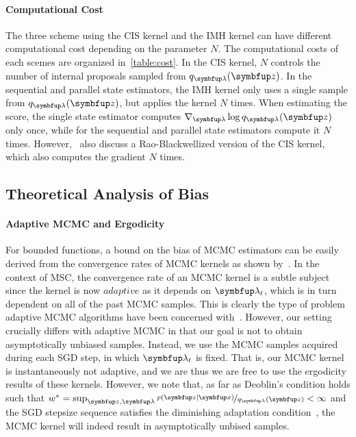\paragraph{Computational Cost}
The three scheme using the CIS kernel and the IMH kernel can have different computational cost depending on the parameter \(N\).
The computational costs of each scemes are organized in~\cref{table:cost}.
In the CIS kernel, \(N\) controls the number of internal proposals sampled from \(q_{\vlambda}(\vz)\).
In the sequential and parallel state estimators, the IMH kernel only uses a single sample from \(q_{\vlambda}(\vz)\), but applies the kernel \(N\) times.
When estimating the score, the single state estimator computes \(\nabla_{\vlambda} \log q_{\vlambda}(\vz)\) only once, while for the sequential and parallel state estimators compute it \(N\) times.
However,~\cite{NEURIPS2020_b2070693} also discuss a Rao-Blackwellized version of the CIS kernel, which also computes the gradient \(N\) times.

\subsection{Theoretical Analysis of Bias}\label{section:theory}

\vspace{-0.05in}
\paragraph{Adaptive MCMC and Ergodicity}
For bounded functions, a bound on the bias of MCMC estimators can be easily derived from the convergence rates of MCMC kernels as shown by~\citet[Theorem 4]{jiang_mcmc_2021}.
In the context of MSC, the convergence rate of an MCMC kernel is a subtle subject since the kernel is now \(adaptive\) as it depends on \(\vlambda_t\), which is in turn dependent on all of the past MCMC samples.
This is clearly the type of problem adaptive MCMC algorithms have been concerned with~\citep{andrieu_ergodicity_2006}.
However, our setting crucially differs with adaptive MCMC in that our goal is not to obtain asymptotically unbiased samples.
Instead, we use the MCMC samples acquired during each SGD step, in which \(\vlambda_t\) is fixed.
That is, our MCMC kernel is instantaneously not adaptive, and we are thus we are free to use the ergodicity results of these kernels.
However, we note that, as far as Deoblin's condition holds such that \(w^* = \sup_{\vz, \vlambda} \nicefrac{p\left(\vz\mid\vx\right)}{q_{\vlambda}\left(\vz\right)}  < \infty\) and the SGD stepsize sequence satisfies the diminishing adaptation condition~\citep{10.2307/27595854}, the MCMC kernel will indeed result in asymptotically unbised samples.

